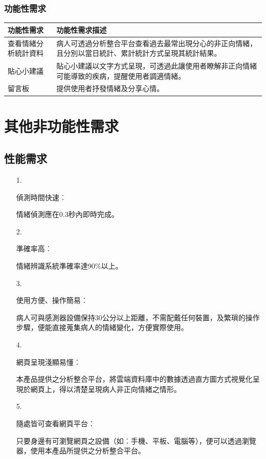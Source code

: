 \documentclass[12pt]{scrreprt}
\begin{document}
\subsection{功能性需求}
\begin{center}  
\begin{tabular}{|l| p{10cm}|}  
\hline  
功能性需求 & 功能性需求描述   \\ \hline  
查看情緒分析統計資料 &病人可透過分析整合平台查看過去最常出現分心的非正向情緒，且分別以當日統計、累計統計方式呈現其統計結果。    \\ \hline  
貼心小建議 &貼心小建議以文字方式呈現，可透過此讓使用者瞭解非正向情緒可能導致的疾病，提醒使用者調適情緒。    \\ \hline
留言板 &提供使用者抒發情緒及分享心情。    \\ \hline

\end{tabular}  
\end{center}  


\chapter{其他非功能性需求}

\section{性能需求}

\begin{itemize}
\item[1.]{\begin{bfseries}偵測時間快速︰\end{bfseries}}情緒偵測應在0.3秒內即時完成。
\item[2.]{\begin{bfseries}準確率高︰\end{bfseries}}情緒辨識系統準確率達90\%以上。
\item[3.]{\begin{bfseries}使用方便、操作簡易︰\end{bfseries}}病人可與感測器設備保持30公分以上距離，不需配戴任何裝置，及繁瑣的操作步驟，便能直接蒐集病人的情緒變化，方便實際使用。
\item[4.]{\begin{bfseries}網頁呈現淺顯易懂︰\end{bfseries}}本產品提供之分析整合平台，將雲端資料庫中的數據透過直方圖方式視覺化呈現於網頁上，得以清楚呈現病人非正向情緒之情形。
\item[5.]{\begin{bfseries}隨處皆可查看網頁平台︰\end{bfseries}}只要身邊有可瀏覽網頁之設備（如︰手機、平板、電腦等），便可以透過瀏覽器，使用本產品所提供之分析整合平台。
\end{itemize}
\end{document}
